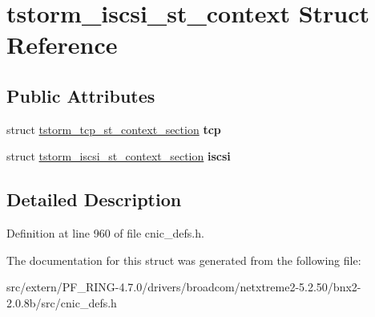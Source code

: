 \hypertarget{structtstorm__iscsi__st__context}{
\section{tstorm\_\-iscsi\_\-st\_\-context Struct Reference}
\label{structtstorm__iscsi__st__context}
}
\subsection*{Public Attributes}
\begin{DoxyCompactItemize}
\item 
\hypertarget{structtstorm__iscsi__st__context_a4f7c457d7f312933c5ba790846be8146}{
struct \hyperlink{structtstorm__tcp__st__context__section}{tstorm\_\-tcp\_\-st\_\-context\_\-section} {\bfseries tcp}}
\label{structtstorm__iscsi__st__context_a4f7c457d7f312933c5ba790846be8146}

\item 
\hypertarget{structtstorm__iscsi__st__context_a94cb36c842c002da90a31a5e4f335557}{
struct \hyperlink{structtstorm__iscsi__st__context__section}{tstorm\_\-iscsi\_\-st\_\-context\_\-section} {\bfseries iscsi}}
\label{structtstorm__iscsi__st__context_a94cb36c842c002da90a31a5e4f335557}

\end{DoxyCompactItemize}


\subsection{Detailed Description}


Definition at line 960 of file cnic\_\-defs.h.



The documentation for this struct was generated from the following file:\begin{DoxyCompactItemize}
\item 
src/extern/PF\_\-RING-\/4.7.0/drivers/broadcom/netxtreme2-\/5.2.50/bnx2-\/2.0.8b/src/cnic\_\-defs.h\end{DoxyCompactItemize}
